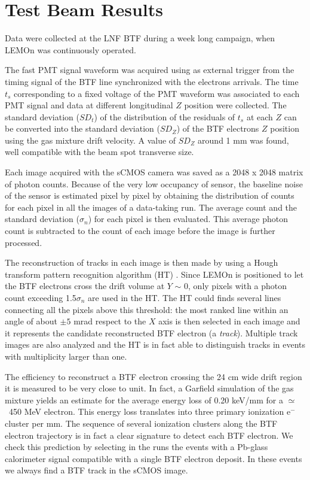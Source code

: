 \documentclass[%
 aip,
 amsmath,amssymb,
 reprint,%
]{revtex4-1}
\begin{document}
\section{Test Beam Results}

Data were collected at the LNF BTF during a week long campaign, when LEMOn was continuously operated. 

The fast PMT signal waveform was acquired using as external trigger from the timing signal of the BTF line synchronized with the electrons arrivals. The time $t_{s}$ corresponding to a fixed voltage of the PMT waveform was associated to each PMT signal and data at different longitudinal $Z$ position were collected. 
The standard deviation ($SD_t$) of the distribution of the residuals of $t_{s}$ at each $Z$ can be converted into the standard deviation ($SD_Z$) of the BTF electrons $Z$ position using the gas mixture drift velocity. A value of $SD_Z$ around  1 mm  was found,  well compatible with the  beam spot transverse size. 

Each image acquired with the sCMOS camera was saved as a 2048 x 2048 matrix of photon counts. 
 Because of the very low occupancy of sensor, the baseline noise of the sensor is estimated pixel by pixel by obtaining the distribution of counts for each pixel in all the images of a data-taking run. The  average count and the standard deviation ($\sigma_n$) for each pixel is then evaluated. This average photon count  is subtracted to the count of each image before the image is further processed. 
 
 The reconstruction  of tracks in each image is then made by using a Hough transform pattern recognition algorithm (HT) \cite{bib:hough}. Since LEMOn is positioned to let the BTF electrons cross the drift volume at $Y$ $\sim$ 0, only pixels with a photon count exceeding 1.5$\sigma_n$ are used in the HT. The HT could finds several lines connecting all the pixels above this threshold: the most ranked line within an angle of about $\pm 5$ mrad respect to the $X$ axis is then selected in each image and it represents the candidate reconstructed BTF electron (a {\it track}). Multiple track images are also analyzed and the HT is in fact able to distinguish  tracks in events with multiplicity larger than one.
 
The efficiency to reconstruct a BTF electron crossing the 24 cm wide drift region it is measured to be very close to unit. In fact, a Garfield \cite{bib:garfield1, bib:garfield} simulation of the  gas mixture yields an  estimate for the  average  energy loss of 0.20 keV/mm for a  $\simeq$~450 MeV electron. This energy loss translates into three primary ionization e$^-$ cluster per mm. The sequence of several ionization clusters along the BTF electron trajectory is in fact a clear signature to detect each BTF electron. 
We check this prediction by selecting in the runs the events with a Pb-glass calorimeter signal compatible with a single BTF  electron  deposit. In these events  we always find a BTF track in the  sCMOS image.
\end{document}
